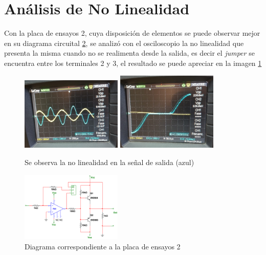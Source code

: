 \documentclass[letterpaper, 10 pt, conference]{ieeeconf}  %
\begin{document}
\section{Análisis de No Linealidad}
Con la placa de ensayos 2, cuya disposición de elementos se puede observar mejor en su diagrama circuital \ref{diagramaPlaca2}, se analizó con el osciloscopio la no linealidad que presenta la misma cuando no se realimenta desde la salida, es decir el \textit{jumper} se encuentra entre los terminales 2 y 3, el resultado se puede apreciar en la imagen \ref{imagen:nolinealidad}

\begin{figure}[H]
   \centering
   \includegraphics[width=0.43\textwidth]{./nolinealidad2.jpeg}
   \includegraphics[width=0.43\textwidth]{./nolinealidad.jpeg}
   \caption{Se observa la no linealidad en la señal de salida (azul)}
   \label{imagen:nolinealidad}
 \end{figure}

\begin{figure}[H]
   \centering
   \includegraphics[width=0.43\textwidth]{./diagramaPlaca2.png}
   \caption{Diagrama correspondiente a la placa de ensayos 2}
   \label{diagramaPlaca2}
 \end{figure}
\end{document}
